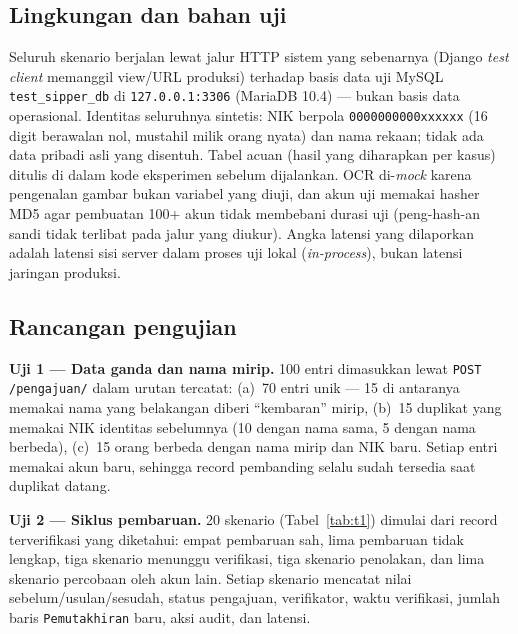 \documentclass[11pt,a4paper]{article}
\begin{document}
\subsection{Lingkungan dan bahan uji}

Seluruh skenario berjalan lewat jalur HTTP sistem yang sebenarnya (Django \emph{test client} memanggil view/URL produksi) terhadap basis data uji MySQL \texttt{test\_sipper\_db} di \texttt{127.0.0.1:3306} (MariaDB 10.4) --- bukan basis data operasional. Identitas seluruhnya sintetis: NIK berpola \texttt{0000000000xxxxxx} (16 digit berawalan nol, mustahil milik orang nyata) dan nama rekaan; tidak ada data pribadi asli yang disentuh. Tabel acuan (hasil yang diharapkan per kasus) ditulis di dalam kode eksperimen sebelum dijalankan. OCR di-\emph{mock} karena pengenalan gambar bukan variabel yang diuji, dan akun uji memakai hasher MD5 agar pembuatan 100+ akun tidak membebani durasi uji (peng-hash-an sandi tidak terlibat pada jalur yang diukur). Angka latensi yang dilaporkan adalah latensi sisi server dalam proses uji lokal (\emph{in-process}), bukan latensi jaringan produksi.

\subsection{Rancangan pengujian}

\textbf{Uji 1 --- Data ganda dan nama mirip.} 100 entri dimasukkan lewat \texttt{POST /pengajuan/} dalam urutan tercatat: (a)~70 entri unik --- 15 di antaranya memakai nama yang belakangan diberi ``kembaran'' mirip, (b)~15 duplikat yang memakai NIK identitas sebelumnya (10 dengan nama sama, 5 dengan nama berbeda), (c)~15 orang berbeda dengan nama mirip dan NIK baru. Setiap entri memakai akun baru, sehingga record pembanding selalu sudah tersedia saat duplikat datang.

\textbf{Uji 2 --- Siklus pembaruan.} 20 skenario (Tabel~\ref{tab:t1}) dimulai dari record terverifikasi yang diketahui: empat pembaruan sah, lima pembaruan tidak lengkap, tiga skenario menunggu verifikasi, tiga skenario penolakan, dan lima skenario percobaan oleh akun lain. Setiap skenario mencatat nilai sebelum/usulan/sesudah, status pengajuan, verifikator, waktu verifikasi, jumlah baris \texttt{Pemutakhiran} baru, aksi audit, dan latensi.
\end{document}

